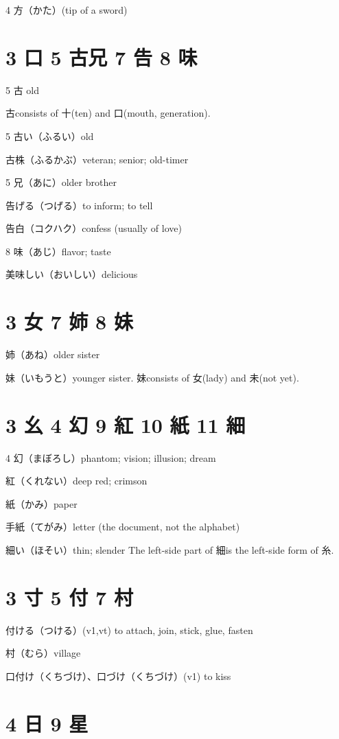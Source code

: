 4 方（かた）(tip of a sword)

\section{3 口 5 古兄 7 告 8 味}

5 古 old

古consists of 十(ten) and 口(mouth, generation).

5 古い（ふるい）old

古株（ふるかぶ）veteran; senior; old-timer

5 兄（あに）older brother

告げる（つげる）to inform; to tell

告白（コクハク）confess (usually of love)

8 味（あじ）flavor; taste

美味しい（おいしい）delicious

\section{3 女 7 姉 8 妹}

姉（あね）older sister

妹（いもうと）younger sister.
妹consists of 女(lady) and 未(not yet).

\section{3 幺 4 幻 9 紅 10 紙 11 細}

4 幻（まぼろし）phantom; vision; illusion; dream

紅（くれない）deep red; crimson

紙（かみ）paper

手紙（てがみ）letter (the document, not the alphabet)

細い（ほそい）thin; slender
The left-side part of 細is the left-side form of 糸.

\section{3 寸 5 付 7 村}

付ける（つける）(v1,vt) to attach, join, stick, glue, fasten

村（むら）village

口付け（くちづけ）、口づけ（くちづけ）(v1) to kiss

\section{4 日 9 星}


